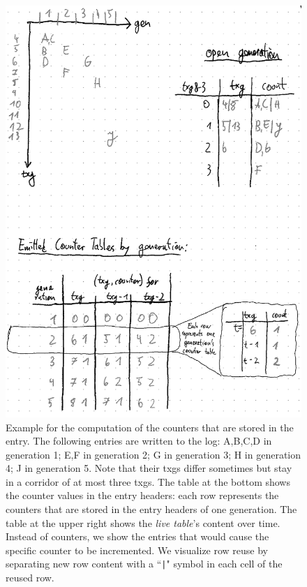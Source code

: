 \documentclass[12pt,a4paper,twoside]{book}
\begin{document}
{\begin{figure}[H]
    \centering
    \includegraphics{fig/prb_counters_table__example}
    \caption{
        Example for the computation of the counters that are stored in the entry.
        The following entries are written to the log:
        A,B,C,D in generation 1; E,F in generation 2; G in generation 3; H in generation 4; J in generation 5.
        Note that their txgs differ sometimes but stay in a corridor of at most three txgs.
        The table at the bottom shows the counter values in the entry headers:
        each row represents the counters that are stored in the entry headers of one generation.
        The table at the upper right shows the \textit{live table}'s content over time.
        Instead of counters, we show the entries that would cause the specific counter to be incremented.
        We visualize row reuse by separating new row content with a ``\lstinline{|}" symbol in each cell of the reused row.
    }
    \label{fig:prb_counters_table__example}
\end{figure}

}
\end{document}
